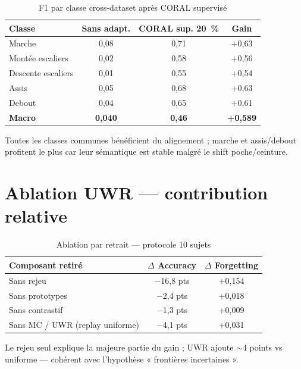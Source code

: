\documentclass[a4paper,12pt]{report}
\begin{document}
\begin{table}[H]
\centering
\small
\begin{tabularx}{0.85\textwidth}{|Y|c|c|c|}
\hline
\textbf{Classe} & \textbf{Sans adapt.} & \textbf{CORAL sup. 20~\%} & \textbf{Gain} \\
\hline
Marche & 0,08 & 0,71 & +0,63 \\
Montée escaliers & 0,02 & 0,58 & +0,56 \\
Descente escaliers & 0,01 & 0,55 & +0,54 \\
Assis & 0,05 & 0,68 & +0,63 \\
Debout & 0,04 & 0,65 & +0,61 \\
\hline
\textbf{Macro} & \textbf{0,040} & \textbf{0,46} & \textbf{+0,589} \\
\hline
\end{tabularx}
\caption{F1 par classe cross-dataset après CORAL supervisé}
\label{tab:app_coral_perclass}
\end{table}

Toutes les classes communes bénéficient du alignement ; marche et assis/debout
profitent le plus car leur sémantique est stable malgré le shift poche/ceinture.

\section{Ablation UWR — contribution relative}

\begin{table}[H]
\centering
\small
\begin{tabularx}{\textwidth}{|Y|c|c|}
\hline
\textbf{Composant retiré} & $\Delta$ Accuracy & $\Delta$ Forgetting \\
\hline
Sans rejeu & $-$16,8 pts & +0,154 \\
Sans prototypes & $-$2,4 pts & +0,018 \\
Sans contrastif & $-$1,3 pts & +0,009 \\
Sans MC / UWR (replay uniforme) & $-$4,1 pts & +0,031 \\
\hline
\end{tabularx}
\caption{Ablation par retrait — protocole 10 sujets}
\label{tab:app_ablation_remove}
\end{table}

Le rejeu seul explique la majeure partie du gain ; UWR ajoute $\sim$4 points
vs uniforme — cohérent avec l'hypothèse « frontières incertaines ».

\FloatBarrier

\end{document}
